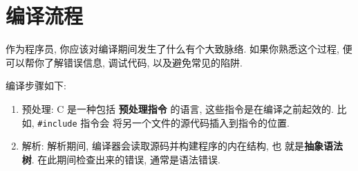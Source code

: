 \documentclass[12pt]{book}
\begin{document}
{%



\section{编译流程}
作为程序员, 你应该对编译期间发生了什么有个大致脉络.
如果你熟悉这个过程, 便可以帮你了解错误信息, 调试代码, 
以及避免常见的陷阱.

编译步骤如下:

\begin{enumerate}
\item 预处理: C 是一种包括 {\bf 预处理指令} 的语言, 
  这些指令是在编译之前起效的. 比如, \verb"#include" 指令会
  将另一个文件的源代码插入到指令的位置.

\item 解析: 解析期间, 编译器会读取源码并构建程序的内在结构, 也
  就是{\bf 抽象语法树}. 在此期间检查出来的错误, 通常是语法错误.


\end{enumerate}}
\end{document}
